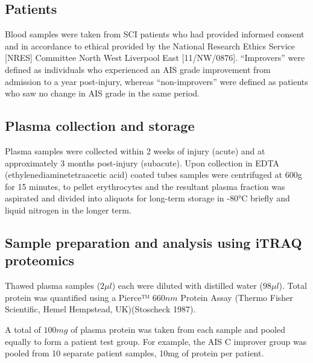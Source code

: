 \documentclass[9pt,lineno]{elife}
\begin{document}
\hypertarget{patients}{%
\subsection{Patients}\label{patients}}

Blood samples were taken from SCI patients who had provided informed consent and in accordance to ethical provided by the National Research Ethics Service {[}NRES{]} Committee North West Liverpool East {[}11/NW/0876{]}.
``Improvers'' were defined as individuals who experienced an AIS grade improvement from admission to a year post-injury, whereas ``non-improvers'' were defined as patients who saw no change in AIS grade in the same period.

\hypertarget{plasma-collection-and-storage}{%
\subsection{Plasma collection and storage}\label{plasma-collection-and-storage}}

Plasma samples were collected within 2 weeks of injury (acute) and at approximately 3 months post-injury (subacute).
Upon collection in EDTA (ethylenediaminetetraacetic acid) coated tubes samples were centrifuged at 600g for 15 minutes, to pellet erythrocytes and the resultant plasma fraction was aspirated and divided into aliquots for long-term storage in -80°C briefly and liquid nitrogen in the longer term.

\hypertarget{itraq-sample-prep}{%
\subsection{Sample preparation and analysis using iTRAQ proteomics}\label{itraq-sample-prep}}

Thawed plasma samples (\(2\mu l\)) each were diluted with distilled water (\(98\mu l\)).
Total protein was quantified using a Pierce™ \(660 nm\) Protein Assay (Thermo Fisher Scientific, Hemel Hempstead, UK)(Stoscheck 1987).

A total of \(100 mg\) of plasma protein was taken from each sample and pooled equally to form a patient test group.
For example, the AIS C improver group was pooled from 10 separate patient samples, 10mg of protein per patient.
\end{document}
